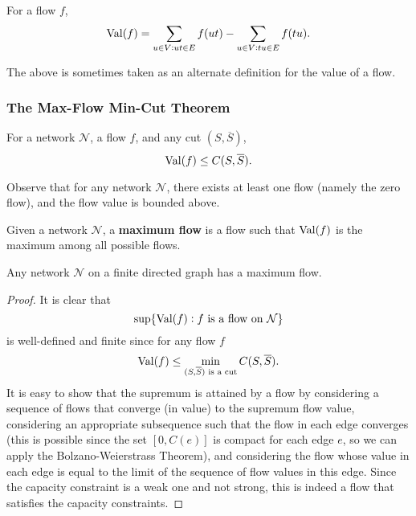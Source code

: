 			\begin{corollary}
				For a flow $f$,
				\[ \operatorname{Val}(f) = \sum_{u \in V : ut \in E} f(ut) - \sum_{u \in V : tu \in E} f(tu). \]
			\end{corollary}

			The above is sometimes taken as an alternate definition for the value of a flow.

		\subsubsection{The Max-Flow Min-Cut Theorem}

			\begin{fcor}
				For a network $\mathcal{N}$, a flow $f$, and any cut $(S,\overline{S})$,
				\[ \operatorname{Val}(f) \le C(S,\overline{S}). \]
			\end{fcor}

			Observe that for any network $\mathcal{N}$, there exists at least one flow (namely the zero flow), and the flow value is bounded above.

			\begin{definition}
				Given a network $\mathcal{N}$, a \textbf{maximum flow} is a flow such that $\operatorname{Val}(f)$ is the maximum among all possible flows.
			\end{definition}

			\begin{theorem}
				Any network $\mathcal{N}$ on a finite directed graph has a maximum flow.
			\end{theorem}
			\begin{proof}
				It is clear that
				\[ \sup\{\operatorname{Val}(f) : f \text{ is a flow on }\mathcal{N}\} \]
				is well-defined and finite since for any flow $f$
				\begin{equation}
					\label{min-cut ge max-flow}
					\operatorname{Val}(f) \le \min_{(S,\overline{S}) \text{ is a cut}} C(S,\overline{S}).
				\end{equation}
				It is easy to show that the supremum is attained by a flow by considering a sequence of flows that converge (in value) to the supremum flow value, considering an appropriate subsequence such that the flow in each edge converges (this is possible since the set $[0,C(e)]$ is compact for each edge $e$, so we can apply the Bolzano-Weierstrass Theorem), and considering the flow whose value in each edge is equal to the limit of the sequence of flow values in this edge. Since the capacity constraint is a weak one and not strong, this is indeed a flow that satisfies the capacity constraints.
			\end{proof}

